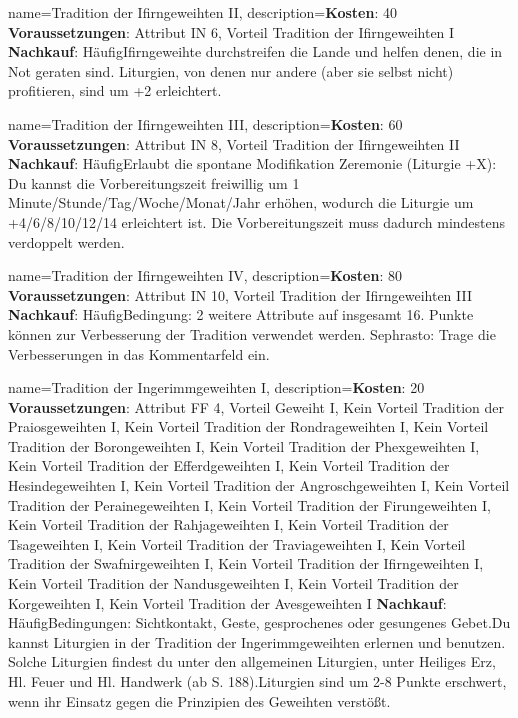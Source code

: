 {
    name={Tradition der Ifirngeweihten II},
    description={\textbf{Kosten}: 40 \textbf{Voraussetzungen}: Attribut IN 6, Vorteil Tradition der Ifirngeweihten I \textbf{Nachkauf}: Häufig\newline Ifirngeweihte durchstreifen die Lande und helfen denen, die in Not geraten sind. Liturgien, von denen nur andere (aber sie selbst nicht) profitieren, sind um +2 erleichtert.}
}


{
    name={Tradition der Ifirngeweihten III},
    description={\textbf{Kosten}: 60 \textbf{Voraussetzungen}: Attribut IN 8, Vorteil Tradition der Ifirngeweihten II \textbf{Nachkauf}: Häufig\newline Erlaubt die spontane Modifikation Zeremonie (Liturgie +X): Du kannst die Vorbereitungszeit freiwillig um 1 Minute/Stunde/Tag/Woche/Monat/Jahr erhöhen, wodurch die Liturgie um +4/6/8/10/12/14 erleichtert ist. Die Vorbereitungszeit muss dadurch mindestens verdoppelt werden.}
}


{
    name={Tradition der Ifirngeweihten IV},
    description={\textbf{Kosten}: 80 \textbf{Voraussetzungen}: Attribut IN 10, Vorteil Tradition der Ifirngeweihten III \textbf{Nachkauf}: Häufig\newline Bedingung: 2 weitere Attribute auf insgesamt 16. Punkte können zur Verbesserung der Tradition verwendet werden. Sephrasto: Trage die Verbesserungen in das Kommentarfeld ein.}
}


{
    name={Tradition der Ingerimmgeweihten I},
    description={\textbf{Kosten}: 20 \textbf{Voraussetzungen}: Attribut FF 4, Vorteil Geweiht I, Kein Vorteil Tradition der Praiosgeweihten I, Kein Vorteil Tradition der Rondrageweihten I, Kein Vorteil Tradition der Borongeweihten I, Kein Vorteil Tradition der Phexgeweihten I, Kein Vorteil Tradition der Efferdgeweihten I, Kein Vorteil Tradition der Hesindegeweihten I, Kein Vorteil Tradition der Angroschgeweihten I, Kein Vorteil Tradition der Perainegeweihten I, Kein Vorteil Tradition der Firungeweihten I, Kein Vorteil Tradition der Rahjageweihten I, Kein Vorteil Tradition der Tsageweihten I, Kein Vorteil Tradition der Traviageweihten I, Kein Vorteil Tradition der Swafnirgeweihten I, Kein Vorteil Tradition der Ifirngeweihten I, Kein Vorteil Tradition der Nandusgeweihten I, Kein Vorteil Tradition der Korgeweihten I, Kein Vorteil Tradition der Avesgeweihten I \textbf{Nachkauf}: Häufig\newline Bedingungen: Sichtkontakt, Geste, gesprochenes oder gesungenes Gebet.\newline Du kannst Liturgien in der Tradition der Ingerimmgeweihten erlernen und benutzen. Solche Liturgien findest du unter den allgemeinen Liturgien, unter Heiliges Erz, Hl. Feuer und Hl. Handwerk (ab S. 188).\newline Liturgien sind um 2-8 Punkte erschwert, wenn ihr Einsatz gegen die Prinzipien des Geweihten verstößt.}
}


